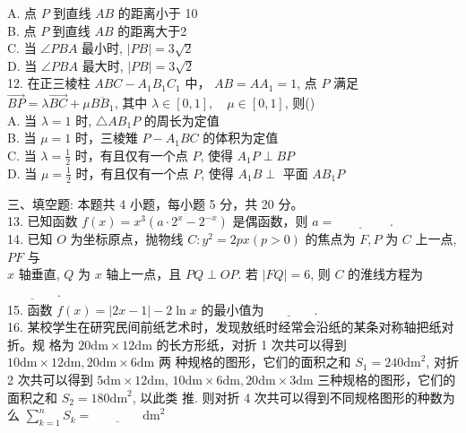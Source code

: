 \documentclass[UTF8]{ctexart}
\begin{document}
	A. 点 $P$ 到直线 $A B$ 的距离小于 10\\
	
	B. 点 $P$ 到直线 $A B$ 的距离大于2\\
	
	C. 当 $\angle P B A$ 最小时, $|P B|=3 \sqrt{2}$\\
	
	D. 当 $\angle P B A$ 最大时, $|P B|=3 \sqrt{2}$\\
	
	12. 在正三棱柱 $A B C-A_{1} B_{1} C_{1}$ 中， $A B=A A_{1}=1$, 点 $P$ 满足 $\overrightarrow{B P}=\lambda \overrightarrow{B C}+\mu \overline{B B_{1}}$, 其中
	$\lambda \in[0,1], \quad \mu \in[0,1]$, 则(\qquad)\\
	
	A. 当 $\lambda=1$ 时, $\triangle A B_{1} P$ 的周长为定值\\
	
	B. 当 $\mu=1$ 时，三棱雉 $P-A_{1} B C$ 的体积为定值\\
	
	C. 当 $\lambda=\frac{1}{2}$ 时，有且仅有一个点 $P$, 使得 $A_{1} P \perp B P$\\
	
	D. 当 $\mu=\frac{1}{2}$ 时，有且仅有一个点 $P$, 使得 $A_{1} B \perp$ 平面 $A B_{1} P$\\
	\newpage
	
	三、填空题: 本题共 4 小题，每小题 5 分，共 20 分。\\
	
	13. 已知函数 $f(x)=x^{3}\left(a \cdot 2^{x}-2^{-x}\right)$ 是偶函数，则 $a=\underline{\qquad\qquad}$ .\\
	
	14. 已知 $O$ 为坐标原点，抛物线 $C: y^{2}=2 p x(p>0)$ 的焦点为 $F, P$ 为 $C$ 上一点, $P F$ 与\\
	
	$x$ 轴垂直, $Q$ 为 $x$ 轴上一点，且 $P Q \perp O P .$ 若 $|F Q|=6$, 则 $C$ 的淮线方程为$ \underline{\qquad\qquad} $.\\
	
	15. 函数 $f(x)=|2 x-1|-2 \ln x$ 的最小值为$ \underline{\qquad\qquad} $.\\
	
	16. 某校学生在研究民间前纸艺术时，发现敖纸时经常会沿纸的某条对称轴把纸对折。规
	格为 $20 \mathrm{dm} \times 12 \mathrm{dm}$ 的长方形纸，对折 1 次共可以得到 $10 \mathrm{dm} \times 12 \mathrm{dm}, 20 \mathrm{dm} \times 6 \mathrm{dm}$ 两
	种规格的图形，它们的面积之和 $S_{1}=240 \mathrm{dm}^{2}$, 对折 2 次共可以得到 $5 \mathrm{dm} \times 12 \mathrm{dm}$,
	$10 \mathrm{dm} \times 6 \mathrm{dm}, 20 \mathrm{dm} \times 3 \mathrm{dm}$ 三种规格的图形，它们的面积之和 $S_{2}=180 \mathrm{dm}^{2}$, 以此类
	推. 则对折 4 次共可以得到不同规格图形的种数为
	么 $\displaystyle{\sum_{k=1}^{n} S_{k}}=$$ \underline{\qquad\qquad} \mathrm{dm}^{2}$\\
	
\end{document}
